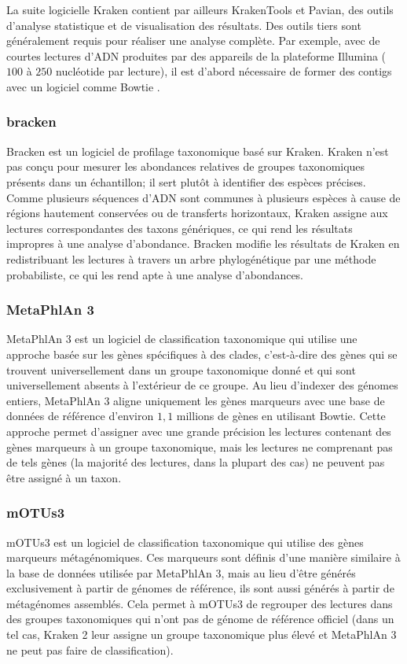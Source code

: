 La suite logicielle Kraken contient par ailleurs KrakenTools et Pavian, des outils d'analyse
statistique et de visualisation des résultats. Des outils tiers sont généralement requis pour
réaliser une analyse complète. Par exemple, avec de courtes lectures d'ADN produites par des
appareils de la plateforme Illumina ($100$ à $250$ nucléotide par lecture), il est d'abord
nécessaire de former des contigs avec un logiciel comme Bowtie \cite{langmead2012fast} \cite{kraken}.

\subsubsection{bracken}
Bracken \cite{bracken} est un logiciel de profilage taxonomique basé sur Kraken. Kraken n'est pas
conçu pour mesurer les abondances relatives de groupes taxonomiques présents dans un échantillon; il
sert plutôt à identifier des espèces précises. Comme plusieurs séquences d'ADN sont communes à
plusieurs espèces à cause de régions hautement conservées ou de transferts horizontaux, Kraken
assigne aux lectures correspondantes des taxons génériques, ce qui rend les résultats impropres à
une analyse d'abondance. Bracken modifie les résultats de Kraken en redistribuant les lectures à
travers un arbre phylogénétique par une méthode probabiliste, ce qui les rend apte à une analyse
d'abondances.

\subsubsection{MetaPhlAn 3}
MetaPhlAn 3 \cite{metaphlan3} est un logiciel de classification taxonomique qui utilise une approche
basée sur les gènes spécifiques à des clades, c'est-à-dire des gènes qui se trouvent universellement
dans un groupe taxonomique donné et qui sont universellement absents à l'extérieur de ce groupe. Au
lieu d'indexer des génomes entiers, MetaPhlAn 3 aligne uniquement les gènes marqueurs avec une base
de données de référence d'environ $1,1$ millions de gènes en utilisant Bowtie. Cette approche permet
d'assigner avec une grande précision les lectures contenant des gènes marqueurs à un groupe
taxonomique, mais les lectures ne comprenant pas de tels gènes (la majorité des lectures, dans la
plupart des cas) ne peuvent pas être assigné à un taxon.

\subsubsection{mOTUs3}
mOTUs3 \cite{motus} est un logiciel de classification taxonomique qui utilise des gènes marqueurs
métagénomiques. Ces marqueurs sont définis d'une manière similaire à la base de données utilisée par
MetaPhlAn 3, mais au lieu d'être générés exclusivement à partir de génomes de référence, ils sont
aussi générés à partir de métagénomes assemblés. Cela permet à mOTUs3 de regrouper des lectures dans
des groupes taxonomiques qui n'ont pas de génome de référence officiel (dans un tel cas, Kraken 2
leur assigne un groupe taxonomique plus élevé et MetaPhlAn 3 ne peut pas faire de classification).

